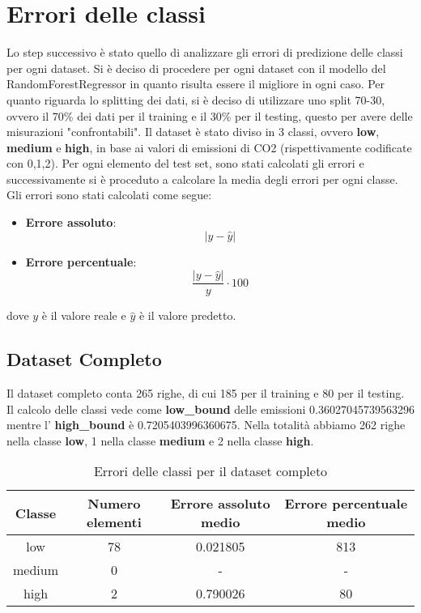 \section{Errori delle classi}

Lo step successivo è stato quello di analizzare gli errori di predizione delle classi per ogni dataset.
Si è deciso di procedere per ogni dataset con il modello del RandomForestRegressor in quanto risulta essere il migliore in ogni caso.
Per quanto riguarda lo splitting dei dati, si è deciso di utilizzare uno split 70-30, ovvero il 70\% dei dati per il training e il 30\% per il testing, questo per avere delle misurazioni "confrontabili".
Il dataset è stato diviso in 3 classi, ovvero \textbf{low}, \textbf{medium} e \textbf{high}, in base ai valori di emissioni di CO2 (rispettivamente codificate con 0,1,2).
Per ogni elemento del test set, sono stati calcolati gli errori e successivamente si è proceduto a calcolare la media degli errori per ogni classe.
Gli errori sono stati calcolati come segue:
\begin{itemize}
    \item \textbf{Errore assoluto}:\begin{equation*}
        |y - \hat{y}|
         \end{equation*}
    \item \textbf{Errore percentuale}: \begin{equation*}
        \frac{|y - \hat{y}|}{y} \cdot 100
    \end{equation*}
\end{itemize}
dove $y$ è il valore reale e $\hat{y}$ è il valore predetto.


\subsection{Dataset Completo}

Il dataset completo conta 265 righe, di cui 185 per il training e 80 per il testing.
Il calcolo delle classi vede come \textbf{low\_bound} delle emissioni 0.36027045739563296 mentre l' \textbf{high\_bound} è 0.7205403996360675.
Nella totalità abbiamo 262 righe nella classe \textbf{low}, 1 nella classe \textbf{medium} e 2 nella classe \textbf{high}.


\begin{table}[H]
    \centering
    \begin{tabular}{|c|c|c|c|}
        \hline
        \textbf{Classe} &  \textbf{Numero elementi} & \textbf{Errore assoluto medio} & \textbf{Errore percentuale medio} \\ \hline
        low             & 78                & 0.021805                   & 813            \\ \hline
        medium          & 0                & -                  & -            \\ \hline
        high            & 2                & 0.790026                   & 80            \\ \hline
    \end{tabular}
    \caption{Errori delle classi per il dataset completo}
\end{table}

